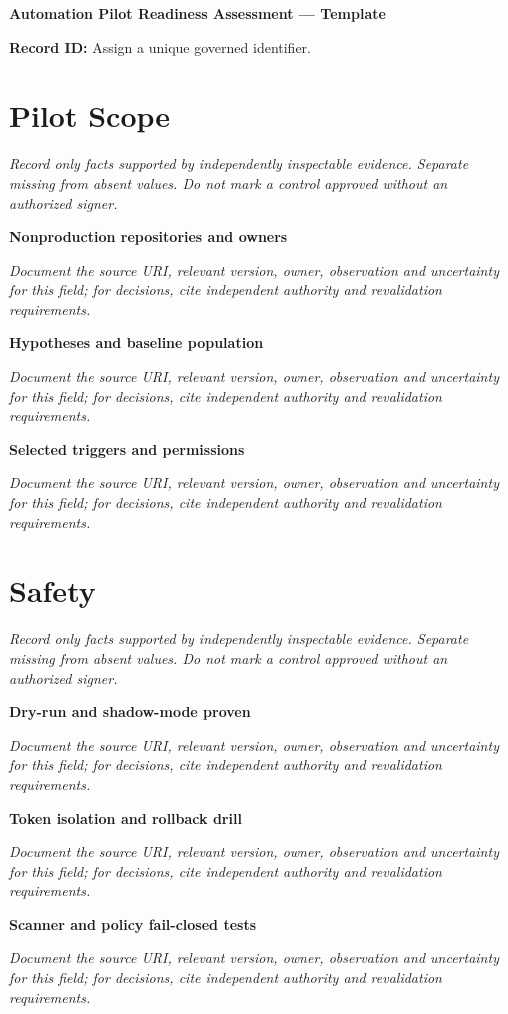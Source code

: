 \documentclass[11pt,letterpaper]{article}
\begin{document}
\begin{center}{\LARGE\bfseries Automation Pilot Readiness Assessment --- Template}\par
\vspace{4pt}{\small Guided authoring instrument (not a completed assessment)}\par
\end{center}
\noindent\textbf{Record ID:} Assign a unique governed identifier.\par
\section{Pilot Scope}
\noindent\emph{Record only facts supported by independently inspectable evidence. Separate missing from absent values. Do not mark a control approved without an authorized signer.}\par
\noindent\textbf{Nonproduction repositories and owners}\par
\noindent\emph{Document the source URI, relevant version, owner, observation and uncertainty for this field; for decisions, cite independent authority and revalidation requirements.}\par\medskip
\noindent\textbf{Hypotheses and baseline population}\par
\noindent\emph{Document the source URI, relevant version, owner, observation and uncertainty for this field; for decisions, cite independent authority and revalidation requirements.}\par\medskip
\noindent\textbf{Selected triggers and permissions}\par
\noindent\emph{Document the source URI, relevant version, owner, observation and uncertainty for this field; for decisions, cite independent authority and revalidation requirements.}\par\medskip
\section{Safety}
\noindent\emph{Record only facts supported by independently inspectable evidence. Separate missing from absent values. Do not mark a control approved without an authorized signer.}\par
\noindent\textbf{Dry-run and shadow-mode proven}\par
\noindent\emph{Document the source URI, relevant version, owner, observation and uncertainty for this field; for decisions, cite independent authority and revalidation requirements.}\par\medskip
\noindent\textbf{Token isolation and rollback drill}\par
\noindent\emph{Document the source URI, relevant version, owner, observation and uncertainty for this field; for decisions, cite independent authority and revalidation requirements.}\par\medskip
\noindent\textbf{Scanner and policy fail-closed tests}\par
\noindent\emph{Document the source URI, relevant version, owner, observation and uncertainty for this field; for decisions, cite independent authority and revalidation requirements.}\par\medskip
\end{document}
